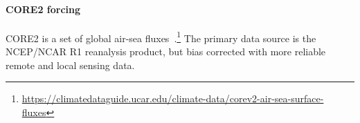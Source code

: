 \paragraph{CORE2 forcing}
CORE2 is a set of global air-sea fluxes~\cite{griffies2012datasets,large2009global,
 hurrell2008new, core2, core2expert}.\footnote{\url{https://climatedataguide.ucar.edu/climate-data/corev2-air-sea-surface-fluxes}}
 The primary data source is the NCEP/NCAR R1 reanalysis product, but bias corrected
 with more reliable remote and local sensing data.


